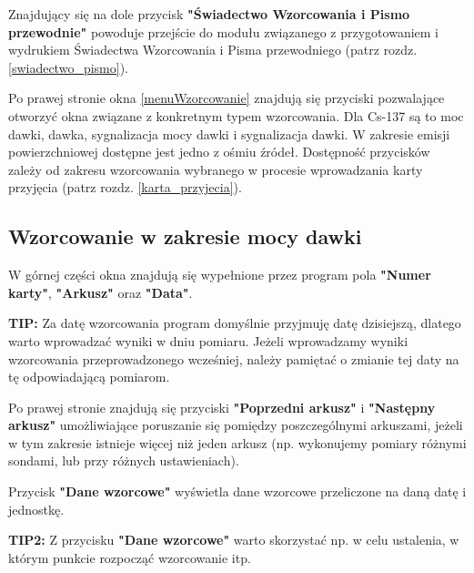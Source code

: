 Znajdujący się na dole przycisk \textbf{"Świadectwo Wzorcowania i Pismo przewodnie"} powoduje przejście do modułu związanego z przygotowaniem i wydrukiem Świadectwa Wzorcowania i Pisma przewodniego (patrz rozdz. \ref{swiadectwo_pismo}).

Po prawej stronie okna \ref{menuWzorcowanie} znajdują się przyciski pozwalające otworzyć okna związane z konkretnym typem wzorcowania. Dla Cs-137 są to moc dawki, dawka, sygnalizacja mocy dawki i sygnalizacja dawki. W zakresie emisji powierzchniowej dostępne jest jedno z ośmiu źródeł. Dostępność przycisków zależy od zakresu wzorcowania wybranego w procesie wprowadzania karty przyjęcia (patrz rozdz. \ref{karta_przyjecia}).

\subsection{Wzorcowanie w zakresie mocy dawki}
\label{wzorcowanie_moc_dawki}

W górnej części okna znajdują się wypełnione przez program pola \textbf{"Numer karty"}, \textbf{"Arkusz"} oraz \textbf{"Data"}. 

\textbf{TIP:} Za datę wzorcowania program domyślnie przyjmuję datę dzisiejszą, dlatego warto wprowadzać wyniki w dniu pomiaru. Jeżeli wprowadzamy wyniki wzorcowania przeprowadzonego wcześniej, należy pamiętać o zmianie tej daty na tę odpowiadającą pomiarom.

Po prawej stronie znajdują się przyciski \textbf{"Poprzedni arkusz"} i \textbf{"Następny arkusz"} umożliwiające poruszanie się pomiędzy poszczególnymi arkuszami, jeżeli w tym zakresie istnieje więcej niż jeden arkusz (np. wykonujemy pomiary różnymi sondami, lub przy różnych ustawieniach).

Przycisk \textbf{"Dane wzorcowe"} wyświetla dane wzorcowe przeliczone na daną datę i jednostkę.

\textbf{TIP2:} Z przycisku \textbf{"Dane wzorcowe"} warto skorzystać np. w celu ustalenia, w którym punkcie rozpocząć wzorcowanie itp.

